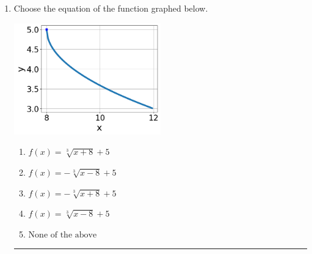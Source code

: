 \documentclass[14pt]{extbook}
\newcommand{\litem}[1]{\item#1\hspace*{-1cm}\rule{\textwidth}{0.4pt}}
\begin{document}
\begin{enumerate}
{\begin{enumerate}[label=\Alph*.]
\end{enumerate} }
\litem{
Choose the equation of the function graphed below.
\begin{center}
    \includegraphics[width=0.5\textwidth]{../Figures/radicalGraphToEquationB.png}
\end{center}
\begin{enumerate}[label=\Alph*.]
\item \( f(x) = \sqrt[3]{x + 8} + 5 \)
\item \( f(x) = - \sqrt[3]{x - 8} + 5 \)
\item \( f(x) = - \sqrt[3]{x + 8} + 5 \)
\item \( f(x) = \sqrt[3]{x - 8} + 5 \)
\item \( \text{None of the above} \)

\end{enumerate} }
\end{enumerate}
\end{document}
